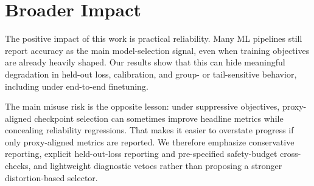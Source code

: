 \section{Broader Impact}
The positive impact of this work is practical reliability.
Many ML pipelines still report accuracy as the main model-selection signal, even when training objectives are already heavily shaped.
Our results show that this can hide meaningful degradation in held-out loss, calibration, and group- or tail-sensitive behavior, including under end-to-end finetuning.

The main misuse risk is the opposite lesson: under suppressive objectives, proxy-aligned checkpoint selection can sometimes improve headline metrics while concealing reliability regressions.
That makes it easier to overstate progress if only proxy-aligned metrics are reported.
We therefore emphasize conservative reporting, explicit held-out-loss reporting and pre-specified safety-budget cross-checks, and lightweight diagnostic vetoes rather than proposing a stronger distortion-based selector.
